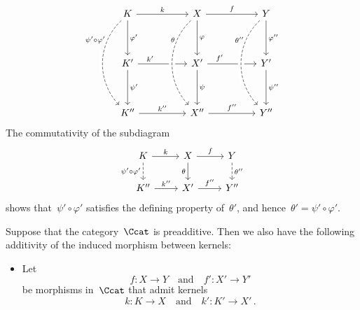 \begin{remark*}
\begin{enumerate}
\begin{itemize}
\[\begin{tikzcd}[sep = huge]
                K
                \arrow{r}[above]{k}
                \arrow{d}[right]{\varphi'}
              & X
                \arrow{r}[above]{f}
                \arrow{d}[right]{\varphi}
              & Y
                \arrow{d}[right]{\varphi''}
              \\
                K'
                \arrow{r}[above, near start]{k'}
                \arrow{d}[right]{\psi'}
              & X'
                \arrow{r}[above, near start]{f'}
                \arrow{d}[right]{\psi}
              & Y'
                \arrow{d}[right]{\psi''}
              \\
                K''
                \arrow{r}[above]{k''}
                \arrow[from=uu, dashed, bend right = 45, crossing over, "\psi' \circ \varphi'" left, near start]
              & X''
                \arrow{r}[above]{f''}
                \arrow[from=uu, dashed, bend right = 45, crossing over, "\theta" left, near start]
              & Y''
                \arrow[from=uu, dashed, bend right = 45, crossing over, "\theta''" left, near start]
            \end{tikzcd}
          \]
          The commutativity of the subdiagram
          \[
            \begin{tikzcd}
                K
                \arrow{r}[above]{k}
                \arrow[dashed]{d}[left]{\psi' \circ \varphi'}
              & X
                \arrow{r}[above]{f}
                \arrow{d}[left]{\theta}
              & Y
                \arrow[dashed]{d}[right]{\theta''}
              \\
                K''
                \arrow{r}[above]{k''}
              & X'
                \arrow{r}[above]{f''}
              & Y''
            \end{tikzcd}
          \]
          shows that~$\psi' \circ \varphi'$ satisfies the defining property of~$\theta'$, and hence~$\theta' = \psi' \circ \varphi'$.
      \end{itemize}
      Suppose that the category~$\Ccat$ is preadditive.
      Then we also have the following additivity of the induced morphism between kernels:
      \begin{itemize}[resume]
        \item
          Let
          \[
            f \colon X \to Y
            \quad\text{and}\quad
            f' \colon X' \to Y'
          \]
          be morphisms in~$\Ccat$ that admit kernels
          \[
            k \colon K \to X
            \quad\text{and}\quad
            k' \colon K' \to X' \,.
\]
\end{itemize}
\end{enumerate}
\end{remark*}
